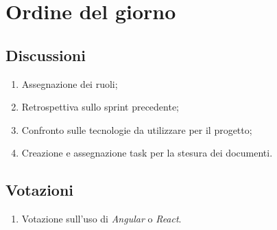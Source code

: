 \section{Ordine del giorno} \label{sec:agenda}
\subsection{Discussioni} \label{subsec:discussione}
\begin{enumerate}
    \item Assegnazione dei ruoli;
    \item Retrospettiva sullo sprint precedente;
    \item Confronto sulle tecnologie da utilizzare per il progetto;
    \item Creazione e assegnazione task per la stesura dei documenti.

\end{enumerate}

\subsection{Votazioni} \label{subsec:votazione}
\begin{enumerate}
    \item Votazione sull'uso di \emph{Angular} o \emph{React}.
\end{enumerate}